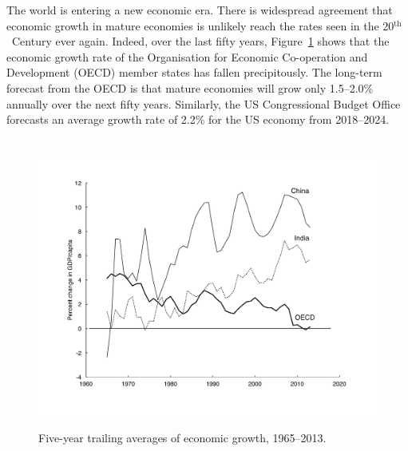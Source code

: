 

The world is entering a new economic era. 
There is widespread agreement that economic growth in mature economies 
is unlikely reach the rates seen in the 20$^\mathrm{th}$~Century ever again.  
Indeed, over the last fifty years, 
Figure~\ref{fig:gdppc}
shows that the economic growth rate of the 
Organisation for Economic Co-operation and Development (OECD) 
member states has fallen precipitously. 
The long-term forecast from the OECD is that mature economies 
will grow only 1.5--2.0\% annually over the next fifty years. 
Similarly, the US Congressional Budget Office forecasts 
an average growth rate of 2.2\% for the US economy 
from 2018--2024.\cite{OECD2014,CBO2014}

\begin{figure}
\centering\
\includegraphics[width=\linewidth]{Part_0/Chapter_Introduction/images/EconGrowth.pdf}
\caption[Economic growth, 1960--2013]{Five-year trailing averages of economic growth, 
1965--2013.\cite{WorldBank2014}}
\label{fig:gdppc}
\end{figure}

